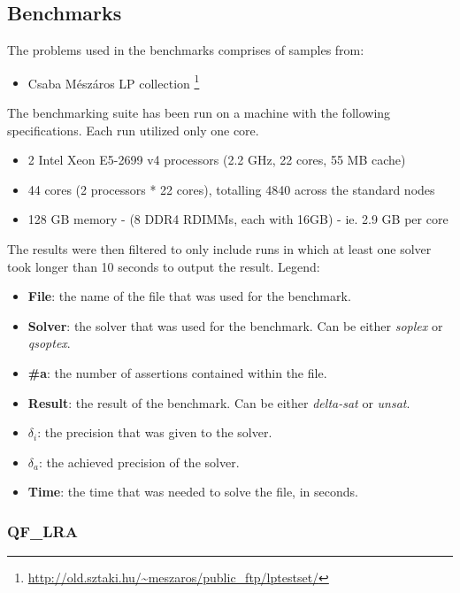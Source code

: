 \begin{appendices}
    \chapter{Benchmarks}\label{appendix:benchmarks}
    The problems used in the benchmarks comprises of samples from:

    \begin{itemize}
        \item Csaba Mészáros LP collection  \footnote{\url{http://old.sztaki.hu/~meszaros/public_ftp/lptestset/}}
    \end{itemize}
    The benchmarking suite has been run on a machine with the following specifications.
    Each run utilized only one core.

    \begin{itemize}
        \item 2 Intel Xeon E5-2699 v4 processors (2.2 GHz, 22 cores, 55 MB cache)
        \item 44 cores (2 processors * 22 cores), totalling 4840 across the standard nodes
        \item 128 GB memory - (8 DDR4 RDIMMs, each with 16GB) - ie. 2.9 GB per core
    \end{itemize}
    The results were then filtered to only include runs in which at least one solver took longer than 10 seconds to output the result.
    Legend:

    \begin{itemize}
        \item \textbf{File}: the name of the file that was used for the benchmark.
        \item \textbf{Solver}: the solver that was used for the benchmark. Can be either \textit{soplex} or \textit{qsoptex}.
        \item \textbf{\#a}: the number of assertions contained within the file.
        \item \textbf{Result}: the result of the benchmark. Can be either \textit{delta-sat} or \textit{unsat}.
        \item \textbf{$\delta_i$}: the precision that was given to the solver.
        \item \textbf{$\delta_a$}: the achieved precision of the solver.
        \item \textbf{Time}: the time that was needed to solve the file, in seconds.
    \end{itemize}

    \subsection*{QF_LRA}


\end{appendices}

